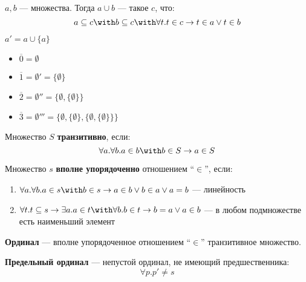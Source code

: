 \begin{notation}
    \(a, b\) --- множества. Тогда \(a \cup b\) --- такое \(c\), что:
    \[a \subseteq c \with b \subseteq c \with \forall t.t \in c \to t \in a \lor t \in b\]
\end{notation}

\begin{definition}
    \(a' = a \cup \{a\}\)
\end{definition}

\begin{notation}\itemfix
    \begin{itemize}
        \item \(\overline 0 = \emptyset\)
        \item \(\overline 1 = \emptyset' = \{\emptyset\}\)
        \item \(\overline 2 = \emptyset'' = \{\emptyset, \{\emptyset\}\}\)
        \item \(\overline 3 = \emptyset''' = \{\emptyset, \{\emptyset\}, \{\emptyset, \{\emptyset\}\}\}\)
    \end{itemize}
\end{notation}

\begin{definition}
    Множество \(S\) \textbf{транзитивно}, если:
    \[\forall a.\forall b.a \in b \with b \in S \to a \in S\]
\end{definition}

\begin{definition}
    Множество \(s\) \textbf{вполне упорядоченно} отношением ``\(\in\)'', если:
    \begin{enumerate}
        \item \(\forall a.\forall b.a \in s \with b \in s \to a \in b \lor b \in a \lor a = b\) --- линейность
        \item \(\forall t.t \subseteq s \to \exists a. a \in t \with \forall b.b \in t \to b = a \lor a \in b\) --- в любом подмножестве есть наименьший элемент
    \end{enumerate}
\end{definition}

\begin{definition}
    \textbf{Ординал} --- вполне упорядоченное отношением ``\(\in\)'' транзитивное множество.
\end{definition}

\begin{definition}
    \textbf{Предельный ординал} --- непустой ординал, не имеющий предшественника:
    \[\forall p.p' \neq s\]
\end{definition}


